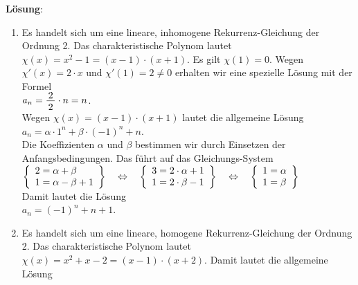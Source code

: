 \documentclass{article}
\newcommand{\bruch}[2]{\frac{\displaystyle \raisebox{1pt}[0pt][-0pt]{$\,#1\,$}}{\displaystyle \raisebox{0pt}[9pt]{$\,#2\,$}}}
\begin{document}
\noindent
\textbf{L\"osung}:
\begin{enumerate}
\item Es handelt sich um eine lineare, inhomogene Rekurrenz-Gleichung der Ordnung 2.
      Das charakteristische Polynom lautet $\chi(x) = x^2 - 1 = (x-1)\cdot(x+1)$. 
      Es gilt $\chi(1) = 0$. Wegen $\chi'(x) = 2\cdot x$ und $\chi'(1) = 2 \not=0$ erhalten wir
      eine spezielle L\"osung mit der Formel
      \\[0.2cm]
      \hspace*{1.3cm}
      $a_n = \bruch{2}{2} \cdot n = n$.
      \\[0.2cm]
      Wegen $\chi(x) = (x-1)\cdot (x+1)$ lautet
      die allgemeine L\"osung 
      \\[0.2cm]
      \hspace*{1.3cm} $a_{n} = \alpha \cdot  1^n + \beta \cdot  (-1)^n + n$.
      \\[0.2cm]
      Die Koeffizienten $\alpha$ und $\beta$ bestimmen wir durch Einsetzen der
      Anfangsbedingungen. Das f\"uhrt auf das Gleichungs-System 
      \\[0.2cm]
      \hspace*{1.3cm}
      $
      \left\{\begin{array}[c]{lcl}
        2 = \alpha + \beta \\
        1 = \alpha - \beta + 1 \\
      \end{array}\right\} \quad \Leftrightarrow\quad
      \left\{\begin{array}[c]{lcl}
        3 = 2\cdot \alpha + 1 \\
        1 = 2\cdot \beta  - 1 \\
      \end{array}\right\} \quad \Leftrightarrow\quad
      \left\{\begin{array}[c]{lcl}
        1 = \alpha  \\
        1 = \beta \\
      \end{array}\right\} 
      $
      \\[0.2cm]
      Damit lautet die L\"osung 
      \\[0.2cm]
      \hspace*{1.3cm} $a_n = (-1)^n + n + 1$.
\item Es handelt sich um eine lineare, homogene Rekurrenz-Gleichung der Ordnung 2.
      Das charakteristische Polynom lautet $\chi(x) = x^2 + x - 2 = (x-1)\cdot (x+2)$. 
      Damit lautet die allgemeine L\"osung 

\end{enumerate}
\end{document}
